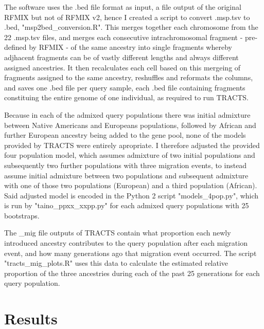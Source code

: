 \documentclass[11pt]{article}
\begin{document}
The software uses the .bed file format as input, a file output of the original RFMIX but not of RFMIX v2, hence I created a script to convert .msp.tsv to .bed, "msp2bed\_conversion.R". This merges together each chromosome from the 22 .msp.tsv files, and merges each consecutive intrachromosomal fragment - pre-defined by RFMIX - of the same ancestry into single fragments whereby adjhacent fragments can be of vastly different lengths and always different assigned ancestries. It then recalculates each cell based on this mergeing of fragments assigned to the same ancestry, reshuffles and reformats the columns, and saves one .bed file per query sample, each .bed file containing fragments constituing the entire genome of one individual, as required to run TRACTS.

Because in each of the admixed query populations there was initial admixture between Native Americans and Europeans populations, followed by African and further European ancestry being added to the gene pool, none of the models provided by TRACTS were entirely apropriate. I therefore adjusted the provided four population model, which assumes admixture of two initial populations and subsequently two further populations with three migration events, to instead assume initial admixture between two populations and subsequent admixture with one of those two populations (European) and a third population (African). Said adjusted model is encoded in the Python 2 script "models\_4pop.py", which is run by "taino\_ppxx\_xxpp.py" for each admixed query populations with 25 bootstraps.

The \_mig file outputs of TRACTS contain what proportion each newly introduced ancestry contributes to the query population after each migration event, and how many generations ago that migration event occurred. The script "tracts\_mig\_plots.R" uses this data to calculate the estimated relative proportion of the three ancestries during each of the past 25 generations for each query population. 








\section{Results}

\end{document}
